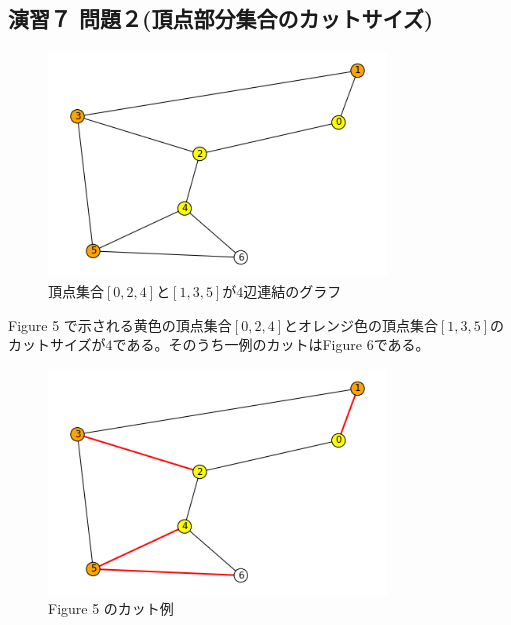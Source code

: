 \documentclass{report}
\begin{document}
\begin{CJK}{UTF8}{min}
    \section*{演習７ 問題２(頂点部分集合のカットサイズ)}
    \begin{figure}[!h]
        \centerline{\includegraphics[width=0.8\textwidth]{data/5.png}}
        \caption{頂点集合$[0,2,4]$と$[1,3,5]$が$4$辺連結のグラフ}
    \end{figure}
    Figure 5 で示される黄色の頂点集合$[0,2,4]$とオレンジ色の頂点集合$[1,3,5]$のカットサイズが$4$である。そのうち一例のカットはFigure 6である。
    \begin{figure}[!h]
        \centerline{\includegraphics[width=0.8\textwidth]{data/6.png}}
        \caption{Figure 5 のカット例}
    \end{figure}

    \clearpage

\end{CJK}
\end{document}
